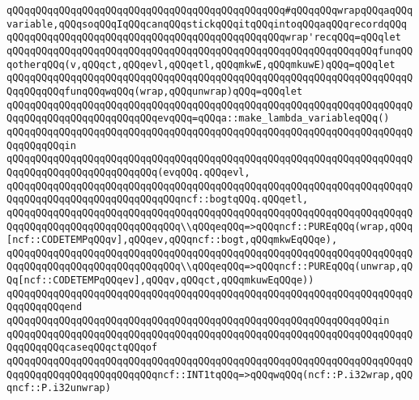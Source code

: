 \newline
\verb|qQQqqQQqqQQqqQQqqQQqqQQqqQQqqQQqqQQqqQQqqQQqqQQq#qQQqqQQqwrapqQQqaqQQqvariable,qQQqsoqQQqIqQQqcanqQQqstickqQQqitqQQqintoqQQqaqQQqrecordqQQq|\newline
\verb|qQQqqQQqqQQqqQQqqQQqqQQqqQQqqQQqqQQqqQQqqQQqqQQqwrap'recqQQq=qQQqlet|\newline
\verb|qQQqqQQqqQQqqQQqqQQqqQQqqQQqqQQqqQQqqQQqqQQqqQQqqQQqqQQqqQQqqQQqfunqQQqotherqQQq(v,qQQqct,qQQqevl,qQQqetl,qQQqmkwE,qQQqmkuwE)qQQq=qQQqlet|\newline
\verb|qQQqqQQqqQQqqQQqqQQqqQQqqQQqqQQqqQQqqQQqqQQqqQQqqQQqqQQqqQQqqQQqqQQqqQQqqQQqqQQqfunqQQqwqQQq(wrap,qQQqunwrap)qQQq=qQQqlet|\newline
\verb|qQQqqQQqqQQqqQQqqQQqqQQqqQQqqQQqqQQqqQQqqQQqqQQqqQQqqQQqqQQqqQQqqQQqqQQqqQQqqQQqqQQqqQQqqQQqqQQqevqQQq=qQQqa::make_lambda_variableqQQq()|\newline
\verb|qQQqqQQqqQQqqQQqqQQqqQQqqQQqqQQqqQQqqQQqqQQqqQQqqQQqqQQqqQQqqQQqqQQqqQQqqQQqqQQqin|\newline
\verb|qQQqqQQqqQQqqQQqqQQqqQQqqQQqqQQqqQQqqQQqqQQqqQQqqQQqqQQqqQQqqQQqqQQqqQQqqQQqqQQqqQQqqQQqqQQqqQQq(evqQQq.qQQqevl,|\newline
\verb|qQQqqQQqqQQqqQQqqQQqqQQqqQQqqQQqqQQqqQQqqQQqqQQqqQQqqQQqqQQqqQQqqQQqqQQqqQQqqQQqqQQqqQQqqQQqqQQqqQQqncf::bogtqQQq.qQQqetl,|\newline
\verb|qQQqqQQqqQQqqQQqqQQqqQQqqQQqqQQqqQQqqQQqqQQqqQQqqQQqqQQqqQQqqQQqqQQqqQQqqQQqqQQqqQQqqQQqqQQqqQQqqQQq\\qQQqeqQQq=>qQQqncf::PUREqQQq(wrap,qQQq[ncf::CODETEMPqQQqv],qQQqev,qQQqncf::bogt,qQQqmkwEqQQqe),|\newline
\verb|qQQqqQQqqQQqqQQqqQQqqQQqqQQqqQQqqQQqqQQqqQQqqQQqqQQqqQQqqQQqqQQqqQQqqQQqqQQqqQQqqQQqqQQqqQQqqQQqqQQq\\qQQqeqQQq=>qQQqncf::PUREqQQq(unwrap,qQQq[ncf::CODETEMPqQQqev],qQQqv,qQQqct,qQQqmkuwEqQQqe))|\newline
\verb|qQQqqQQqqQQqqQQqqQQqqQQqqQQqqQQqqQQqqQQqqQQqqQQqqQQqqQQqqQQqqQQqqQQqqQQqqQQqqQQqend|\newline
\verb|qQQqqQQqqQQqqQQqqQQqqQQqqQQqqQQqqQQqqQQqqQQqqQQqqQQqqQQqqQQqqQQqin|\newline
\verb|qQQqqQQqqQQqqQQqqQQqqQQqqQQqqQQqqQQqqQQqqQQqqQQqqQQqqQQqqQQqqQQqqQQqqQQqqQQqqQQqcaseqQQqctqQQqof|\newline
\verb|qQQqqQQqqQQqqQQqqQQqqQQqqQQqqQQqqQQqqQQqqQQqqQQqqQQqqQQqqQQqqQQqqQQqqQQqqQQqqQQqqQQqqQQqqQQqqQQqncf::INT1tqQQq=>qQQqwqQQq(ncf::P.i32wrap,qQQqncf::P.i32unwrap)|\newline
